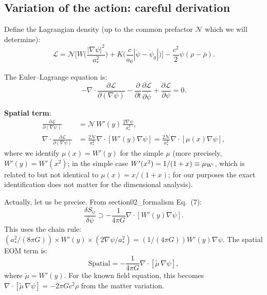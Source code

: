 \documentclass[11pt]{article}
\begin{document}
\subsection{Variation of the action: careful derivation}

Define the Lagrangian density (up to the common prefactor $\mathcal{N}$ which we will determine):
\begin{equation}
\mathcal{L} = \mathcal{N}\biggl[
  W\!\biggl(\frac{|\nabla\psi|^2}{a_*^2}\biggr)
  + K\!\biggl(\frac{c}{a_0}|\dot\psi - \dot\psi_0|\biggr)
\biggr]
- \frac{c^2}{2}\psi(\rho - \bar\rho).
\end{equation}

The Euler--Lagrange equation is:
\begin{equation}
-\nabla\cdot\frac{\partial\mathcal{L}}{\partial(\nabla\psi)}
- \frac{\partial}{\partial t}\frac{\partial\mathcal{L}}{\partial\dot\psi}
+ \frac{\partial\mathcal{L}}{\partial\psi} = 0.
\end{equation}

\textbf{Spatial term}:
\begin{align}
\frac{\partial\mathcal{L}}{\partial(\nabla\psi)}
&= \mathcal{N}\,W'(y)\,\frac{2\nabla\psi}{a_*^2}, \\
\nabla\cdot\frac{\partial\mathcal{L}}{\partial(\nabla\psi)}
&= \frac{2\mathcal{N}}{a_*^2}\nabla\cdot[W'(y)\nabla\psi]
= \frac{2\mathcal{N}}{a_*^2}\nabla\cdot[\mu(x)\nabla\psi],
\end{align}
where we identify $\mu(x) = W'(y)$ for the simple $\mu$ (more precisely, $W'(y) = W'(x^2)$; in the simple case $W'(x^2) = 1/(1+x) \equiv \mu_{\rm W'}$, which is related to but not identical to $\mu(x) = x/(1+x)$; for our purposes the exact identification does not matter for the dimensional analysis).

Actually, let us be precise. From section02\_formalism Eq.~(7):
\begin{equation}
\frac{\delta S_\psi}{\delta\psi} \supset -\frac{1}{4\pi G}\nabla\cdot[W'(y)\nabla\psi].
\end{equation}
This uses the chain rule: $(a_*^2/(8\pi G)) \times W'(y) \times (2\nabla\psi/a_*^2) = (1/(4\pi G))W'(y)\nabla\psi$. The spatial EOM term is:
\begin{equation}
\text{Spatial} = -\frac{1}{4\pi G}\nabla\cdot[\tilde\mu\,\nabla\psi],
\end{equation}
where $\tilde\mu = W'(y)$. For the known field equation, this becomes $\nabla\cdot[\tilde\mu\,\nabla\psi] = -2\pi G c^2 \rho$ from the matter variation.
\end{document}
